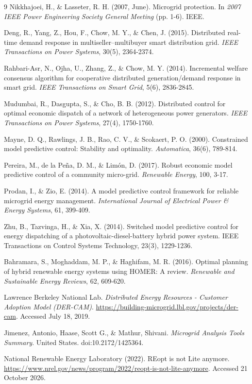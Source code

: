 \documentclass[final,3p,times]{elsarticle}
\begin{document}
\begin{thebibliography}{9}
Nikkhajoei, H., \& Lasseter, R. H. (2007, June). Microgrid protection. In \textit{2007 IEEE Power Engineering Society General Meeting} (pp. 1-6). IEEE.

Deng, R., Yang, Z., Hou, F., Chow, M. Y., \& Chen, J. (2015). Distributed real-time demand response in multiseller–multibuyer smart distribution grid. \textit{IEEE Transactions on Power Systems}, 30(5), 2364-2374.

Rahbari-Asr, N., Ojha, U., Zhang, Z., \& Chow, M. Y. (2014). Incremental welfare consensus algorithm for cooperative distributed generation/demand response in smart grid. \textit{IEEE Transactions on Smart Grid}, 5(6), 2836-2845.

Mudumbai, R., Dasgupta, S., \& Cho, B. B. (2012). Distributed control for optimal economic dispatch of a network of heterogeneous power generators. \textit{IEEE Transactions on Power Systems}, 27(4), 1750-1760.

Mayne, D. Q., Rawlings, J. B., Rao, C. V., \& Scokaert, P. O. (2000). Constrained model predictive control: Stability and optimality. \textit{Automatica}, 36(6), 789-814.

Pereira, M., de la Peña, D. M., \& Limón, D. (2017). Robust economic model predictive control of a community micro-grid. \textit{Renewable Energy}, 100, 3-17.

Prodan, I., \& Zio, E. (2014). A model predictive control framework for reliable microgrid energy management. \textit{International Journal of Electrical Power \& Energy Systems}, 61, 399-409.

Zhu, B., Tazvinga, H., \& Xia, X. (2014). Switched model predictive control for energy dispatching of a photovoltaic-diesel-battery hybrid power system. IEEE Transactions on Control Systems Technology, 23(3), 1229-1236.

Bahramara, S., Moghaddam, M. P., \& Haghifam, M. R. (2016). Optimal planning of hybrid renewable energy systems using HOMER: A review. \textit{Renewable and Sustainable Energy Reviews}, 62, 609-620.

Lawrence Berkeley National Lab. \textit{Distributed Energy Resources - Customer Adoption Model (DER-CAM)}. \url{https://building-microgrid.lbl.gov/projects/der-cam}. Accessed July 18, 2019.

Jimenez, Antonio, Haase, Scott G., \& Mathur, Shivani. \textit{Microgrid Analysis Tools Summary}. United States. doi:10.2172/1425364.

National Renewable Energy Laboratory (2022). REopt is not Lite anymore. \url{https://www.nrel.gov/news/program/2022/reopt-is-not-lite-anymore}. Accessed 21 October 2026.

\end{thebibliography}
\end{document}
